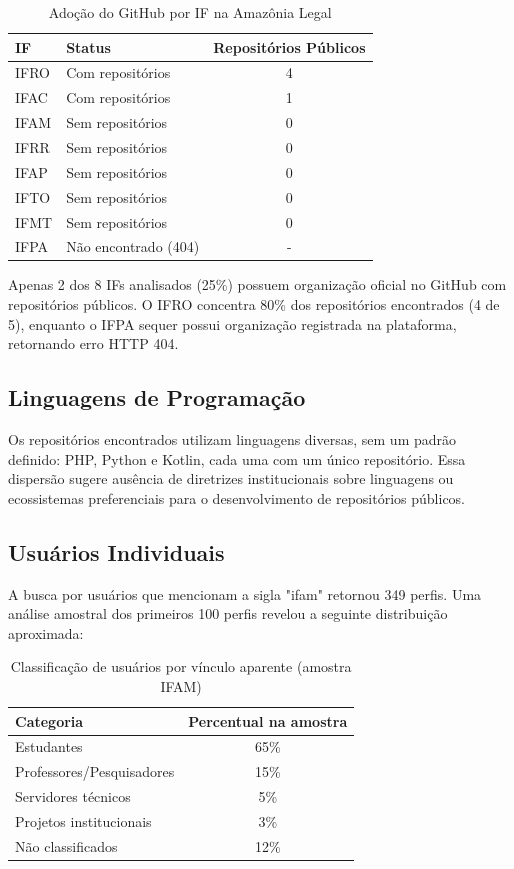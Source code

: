 \documentclass[english, spanish, brazilian]{RBIEarticle}
\begin{document}
\begin{table}[!htb]
\centering
\caption{Adoção do GitHub por IF na Amazônia Legal}
\label{tab:resultados}
\begin{tabular}{|l|l|c|}
\hline
\textbf{IF} & \textbf{Status} & \textbf{Repositórios Públicos} \\
\hline
IFRO & Com repositórios & 4 \\
IFAC & Com repositórios & 1 \\
IFAM & Sem repositórios & 0 \\
IFRR & Sem repositórios & 0 \\
IFAP & Sem repositórios & 0 \\
IFTO & Sem repositórios & 0 \\
IFMT & Sem repositórios & 0 \\
IFPA & Não encontrado (404) & - \\
\hline
\end{tabular}
\end{table}

Apenas 2 dos 8 IFs analisados (25\%) possuem organização oficial no GitHub com repositórios públicos. O IFRO concentra 80\% dos repositórios encontrados (4 de 5), enquanto o IFPA sequer possui organização registrada na plataforma, retornando erro HTTP 404.

\subsection{Linguagens de Programação}

Os repositórios encontrados utilizam linguagens diversas, sem um padrão definido: PHP, Python e Kotlin, cada uma com um único repositório. Essa dispersão sugere ausência de diretrizes institucionais sobre linguagens ou ecossistemas preferenciais para o desenvolvimento de repositórios públicos.


\subsection{Usuários Individuais}

A busca por usuários que mencionam a sigla "ifam" retornou 349 perfis. Uma análise amostral dos primeiros 100 perfis revelou a seguinte distribuição aproximada:

\begin{table}[!htb]
\centering
\caption{Classificação de usuários por vínculo aparente (amostra IFAM)}
\label{tab:usuarios}
\begin{tabular}{|l|c|}
\hline
\textbf{Categoria} & \textbf{Percentual na amostra} \\
\hline
Estudantes & 65\% \\
Professores/Pesquisadores & 15\% \\
Servidores técnicos & 5\% \\
Projetos institucionais & 3\% \\
Não classificados & 12\% \\
\hline
\end{tabular}
\end{table}
\end{document}

